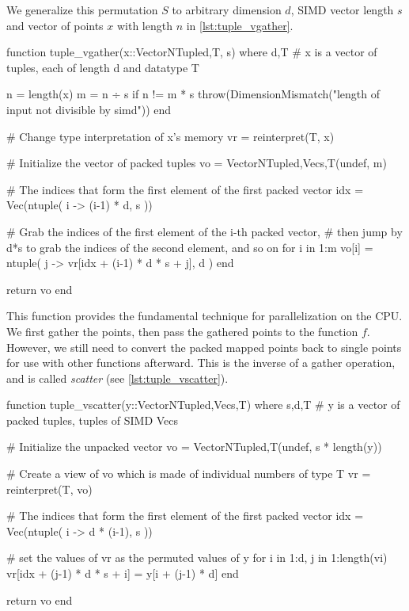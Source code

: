 We generalize this permutation $S$ to arbitrary dimension $d$, SIMD vector length $s$ and 
vector of points $x$ with length $n$ in \autoref{lst:tuple_vgather}. \\

\begin{jllisting}[float, language=julia, style=jlcodestyle, label=lst:tuple_vgather, caption=Conversion function to packed tuples]
    function tuple_vgather(x::Vector{NTuple{d,T}}, s) where {d,T}
        # x is a vector of tuples, each of length d and datatype T
    
        n = length(x)                                   
        m = n ÷ s
        if n != m * s
            throw(DimensionMismatch("length of input not divisible by simd"))
        end
    
        # Change type interpretation of x's memory
        vr = reinterpret(T, x)
    
        # Initialize the vector of packed tuples
        vo = Vector{NTuple{d,Vec{s,T}}}(undef, m)
    
        # The indices that form the first element of the first packed vector
        idx = Vec(ntuple( i -> (i-1) * d, s ))
    
        # Grab the indices of the first element of the i-th packed vector, 
        # then jump by d*s to grab the indices of the second element, and so on
        for i in 1:m
            vo[i] = ntuple( j -> vr[idx + (i-1) * d * s + j], d )
        end                                             
        
        return vo
    end
\end{jllisting}

This function provides the fundamental technique for parallelization on the CPU. We first 
gather the points, then pass the gathered points to the function $f$. However, we still 
need to convert the packed mapped points back to single points for use with other 
functions afterward. This is the inverse of a gather operation, and is called 
\emph{scatter} (see \autoref{lst:tuple_vscatter}). \\

\begin{jllisting}[float, language=julia, style=jlcodestyle, label=lst:tuple_vscatter, caption=Conversion back to single tuples]
    function tuple_vscatter(y::Vector{NTuple{d,Vec{s,T}}}) where {s,d,T}
        # y is a vector of packed tuples, tuples of SIMD Vecs

        # Initialize the unpacked vector
        vo = Vector{NTuple{d,T}}(undef, s * length(y))

        # Create a view of vo which is made of individual numbers of type T 
        vr = reinterpret(T, vo)

        # The indices that form the first element of the first packed vector
        idx = Vec(ntuple( i -> d * (i-1), s ))

        # set the values of vr as the permuted values of y
        for i in 1:d, j in 1:length(vi)
            vr[idx + (j-1) * d * s + i] = y[i + (j-1) * d]
        end

        return vo
    end
\end{jllisting}

